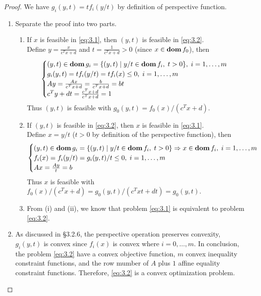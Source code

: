 \documentclass[12pt]{extarticle}
\theoremstyle{definition}
\begin{document}
\begin{proof}
  We have $g_i(y,t)=tf_i(y/t)$ by definition of perspective function.
  \begin{enumerate}[label=(\alph*)]
    \item Separate the proof into two parts.
      \begin{enumerate}[label=(\roman*)]
        \item If $x$ is feasible in \eqref{eq:3.1}, then $(y, t)$ is feasible in \eqref{eq:3.2}.\\
              Define $y=\frac{x}{c^Tx+d}$ and $t=\frac{1}{c^Tx+d}>0$ (since $x\in\mathop{\bf dom} f_0$), then
              \begin{align*}
                \begin{cases}
                  (y,t)\in\mathop{\bf dom} g_i=\{(y,t)\mid y/t\in\mathop{\bf dom} f_i,\;t>0\},\;i=1,\dots,m\\
                  g_i(y,t)=tf_i(y/t)=tf_i(x)\le 0,\;i=1,\dots,m\\
                  Ay=\frac{Ax}{c^Tx+d}=\frac{b}{c^Tx+d}=bt\\
                  c^Ty+dt=\frac{c^Tx+d}{c^Tx+d}=1
                \end{cases}
              \end{align*}
              Thus $(y,t)$ is feasible with $g_0(y,t)=f_0(x)/(c^Tx+d)$.
        \item If $(y, t)$ is feasible in \eqref{eq:3.2}, then $x$ is feasible in \eqref{eq:3.1}.\\
              Define $x=y/t$ ($t>0$ by definition of the perspective function), then
              \begin{align*}
                \begin{cases}
                  (y,t)\in\mathop{\bf dom} g_i=\{(y,t)\mid y/t\in\mathop{\bf dom} f_i,\;t>0\}\Rightarrow x\in\mathop{\bf dom} f_i,\;i=1,\dots,m\\
                  f_i(x)=f_i(y/t)=g_i(y,t)/t\le 0,\;i=1,\dots,m\\
                  Ax=\frac{Ay}{t}=b
                \end{cases}
              \end{align*}
              Thus $x$ is feasible with $f_0(x)/(c^Tx+d)=g_0(y,t)/(c^Txt+dt)=g_0(y,t)$.
        \item From (i) and (ii), we know that problem \eqref{eq:3.1} is equivalent to problem \eqref{eq:3.2}.
      \end{enumerate}
    \item As discussed in \S 3.2.6, the perspective operation preserves convexity, \ie $g_i(y,t)$ is convex since $f_i(x)$ is convex where $i=0,\dots,m$.
          In conclusion, the problem \eqref{eq:3.2} have a convex objective function, $m$ convex inequality constraint functions, and the row mumber of $A$ plus $1$ affine equality constraint functions.
          Therefore, \eqref{eq:3.2} is a convex optimization problem.\qedhere
  \end{enumerate}
\end{proof}
\end{document}
